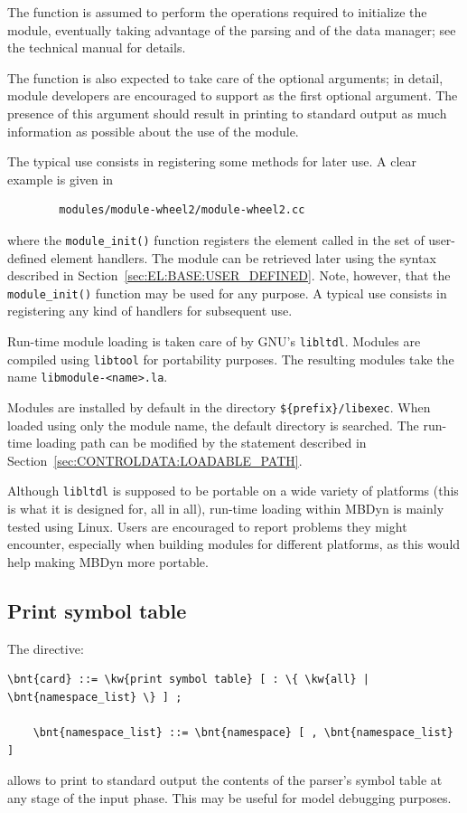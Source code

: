 The function is assumed to perform the operations required to initialize
the module, eventually taking advantage of the parsing
and of the data manager; see the technical manual for details.

The function is also expected to take care of the optional 
arguments; in detail, module developers are encouraged to support
 as the first optional argument.
The presence of this argument should result in printing to standard output
as much information as possible about the use of the module.

The typical use consists in registering some methods for later use.
A clear example is given in
\begin{verbatim}
        modules/module-wheel2/module-wheel2.cc
\end{verbatim}
where the \texttt{module\_init()} function registers
the  element called 
in the set of user-defined element handlers.
The module can be retrieved later using the syntax described
in Section~\ref{sec:EL:BASE:USER_DEFINED}.
Note, however, that the \texttt{module\_init()} function may be used
for any purpose.
A typical use consists in registering any kind of handlers
for subsequent use.

Run-time module loading is taken care of by GNU's \texttt{libltdl}.
Modules are compiled using \texttt{libtool} for portability purposes.
The resulting modules take the name
\texttt{libmodule-<name>.la}.

Modules are installed by default in the directory
\texttt{\$\{prefix\}/libexec}.
When loaded using only the module name, the default directory is searched.
The run-time loading path can be modified by the 
 statement described
in Section~\ref{sec:CONTROLDATA:LOADABLE_PATH}.

Although \texttt{libltdl} is supposed to be portable on a wide variety
of platforms (this is what it is designed for, all in all),
run-time loading within MBDyn is mainly tested using Linux.
Users are encouraged to report problems they might encounter,
especially when building modules for different platforms,
as this would help making MBDyn more portable.



\subsection{Print symbol table}
The  directive:
\begin{Verbatim}[commandchars=\\\{\}]
    \bnt{card} ::= \kw{print symbol table} [ : \{ \kw{all} | \bnt{namespace_list} \} ] ;

    \bnt{namespace_list} ::= \bnt{namespace} [ , \bnt{namespace_list} ]
\end{Verbatim}
allows to print to standard output the contents of the parser's symbol
table at any stage of the input phase.
This may be useful for model debugging purposes.

